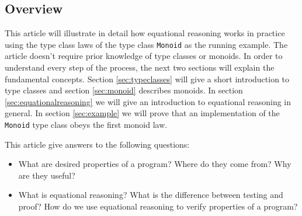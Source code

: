 \subsection{Overview}

This article will illustrate in detail how equational reasoning works in practice using the type class laws of the type class \verb|Monoid| as the running example. The article doesn't require prior knowledge of type classes or \glspl{monoid}. In order to understand every step of the process, the next two sections will explain the fundamental concepts.
Section \ref{sec:typeclasses} will give a short introduction to type classes and section \ref{sec:monoid} describes monoids. In section \ref{sec:equationalreasoning} we will give an introduction to equational reasoning in general. In section \ref{sec:example} we will prove that an implementation of the \verb|Monoid| type class obeys the first monoid law.  


This article give answers to the following questions:
\begin{itemize}
\item What are desired properties of a program? Where do they come from? Why are they useful?
\item What is equational reasoning? What is the difference between testing and proof? How do we use equational reasoning to verify properties of a program?
\end{itemize}

